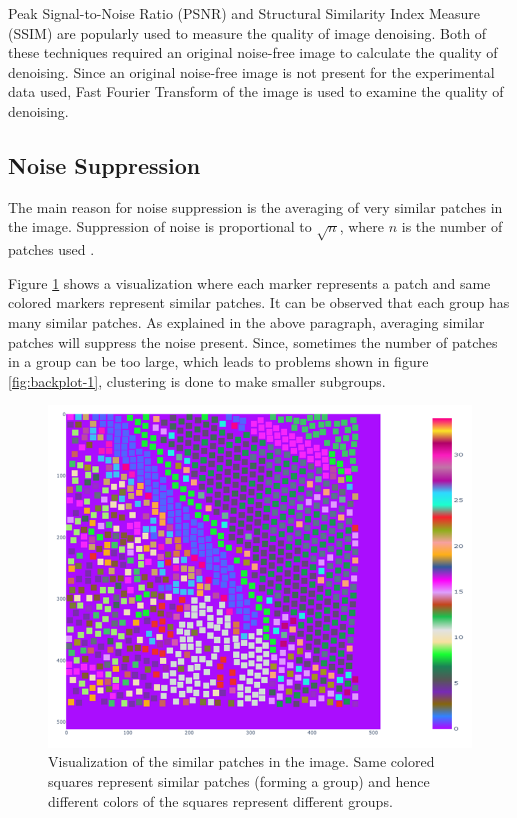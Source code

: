 \documentclass[fleqn,10pt]{wlscirep}
\begin{document}
Peak Signal-to-Noise Ratio (PSNR) and Structural Similarity Index Measure (SSIM) are popularly used to measure the quality of image denoising. Both of these techniques required an original noise-free image to calculate the quality of denoising. Since an original noise-free image is not present for the experimental data used, Fast Fourier Transform  of the image is used to examine the quality of denoising. 





\subsection*{Noise Suppression}

The main reason for noise suppression is the averaging of very similar patches in the image. Suppression of noise is proportional to $\sqrt{n}$, where $n$ is the number of patches used \cite{bcm_nlm}.

Figure \ref{fig:similar_patches} shows a visualization where each marker represents a patch and same colored markers represent similar patches. It can be observed that each group has many similar patches. As explained in the above paragraph, averaging similar patches will suppress the noise present. Since, sometimes the number of patches in a group can be too large, which leads to problems shown in figure \ref{fig:backplot-1}, clustering is done to make smaller subgroups.

\begin{figure}[H]
	\centering
	\includegraphics[scale=0.5]{./imgs/similar_patches.png}
	\caption[Visualization of the similar patches in the image]{Visualization of the similar patches in the image. Same colored squares represent similar patches (forming a group) and hence different colors of the squares represent different groups.}
	\label{fig:similar_patches}
\end{figure}
\end{document}

